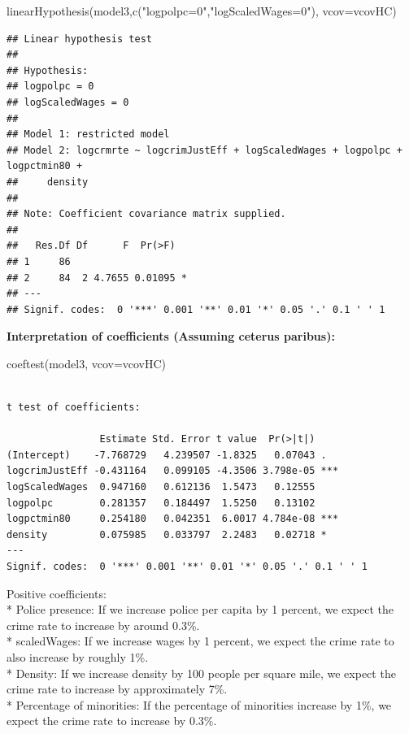 \documentclass[]{article}
\newenvironment{Shaded}{}{}
\newcommand{\DataTypeTok}[1]{#1}
\newcommand{\KeywordTok}[1]{\textcolor[rgb]{0.00,0.00,1.00}{#1}}
\newcommand{\NormalTok}[1]{#1}
\newcommand{\StringTok}[1]{\textcolor[rgb]{0.00,0.50,0.50}{#1}}
\begin{document}
\begin{Shaded}
\begin{Highlighting}[]
\KeywordTok{linearHypothesis}\NormalTok{(model3,}\KeywordTok{c}\NormalTok{(}\StringTok{"logpolpc=0"}\NormalTok{,}\StringTok{"logScaledWages=0"}\NormalTok{), }\DataTypeTok{vcov=}\NormalTok{vcovHC)}
\end{Highlighting}
\end{Shaded}

\begin{verbatim}
## Linear hypothesis test
## 
## Hypothesis:
## logpolpc = 0
## logScaledWages = 0
## 
## Model 1: restricted model
## Model 2: logcrmrte ~ logcrimJustEff + logScaledWages + logpolpc + logpctmin80 + 
##     density
## 
## Note: Coefficient covariance matrix supplied.
## 
##   Res.Df Df      F  Pr(>F)  
## 1     86                    
## 2     84  2 4.7655 0.01095 *
## ---
## Signif. codes:  0 '***' 0.001 '**' 0.01 '*' 0.05 '.' 0.1 ' ' 1
\end{verbatim}

\textbf{Interpretation of coefficients (Assuming ceterus paribus):}

\begin{Shaded}
\begin{Highlighting}[]
\KeywordTok{coeftest}\NormalTok{(model3, }\DataTypeTok{vcov=}\NormalTok{vcovHC)}
\end{Highlighting}
\end{Shaded}

\begin{verbatim}

t test of coefficients:

                Estimate Std. Error t value  Pr(>|t|)    
(Intercept)    -7.768729   4.239507 -1.8325   0.07043 .  
logcrimJustEff -0.431164   0.099105 -4.3506 3.798e-05 ***
logScaledWages  0.947160   0.612136  1.5473   0.12555    
logpolpc        0.281357   0.184497  1.5250   0.13102    
logpctmin80     0.254180   0.042351  6.0017 4.784e-08 ***
density         0.075985   0.033797  2.2483   0.02718 *  
---
Signif. codes:  0 '***' 0.001 '**' 0.01 '*' 0.05 '.' 0.1 ' ' 1
\end{verbatim}

Positive coefficients:\\
* Police presence: If we increase police per capita by 1 percent, we
expect the crime rate to increase by around 0.3\%.\\
* scaledWages: If we increase wages by 1 percent, we expect the crime
rate to also increase by roughly 1\%.\\
* Density: If we increase density by 100 people per square mile, we
expect the crime rate to increase by approximately 7\%.\\
* Percentage of minorities: If the percentage of minorities increase by
1\%, we expect the crime rate to increase by 0.3\%.
\end{document}
